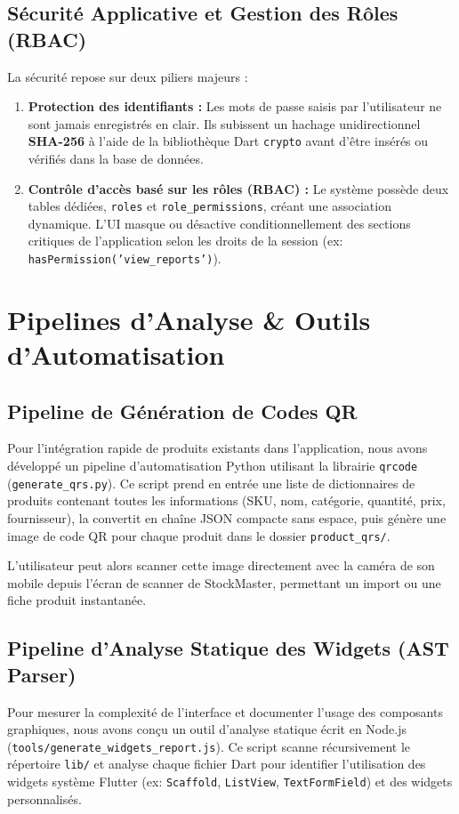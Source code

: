 \documentclass[12pt,a4paper]{report}
\begin{document}
\section{Sécurité Applicative et Gestion des Rôles (RBAC)}
La sécurité repose sur deux piliers majeurs :
\begin{enumerate}
    \item \textbf{Protection des identifiants :} Les mots de passe saisis par l'utilisateur ne sont jamais enregistrés en clair. Ils subissent un hachage unidirectionnel \textbf{SHA-256} à l'aide de la bibliothèque Dart \texttt{crypto} avant d'être insérés ou vérifiés dans la base de données.
    \item \textbf{Contrôle d'accès basé sur les rôles (RBAC) :} Le système possède deux tables dédiées, \texttt{roles} et \texttt{role\_permissions}, créant une association dynamique. L'UI masque ou désactive conditionnellement des sections critiques de l'application selon les droits de la session (ex: \texttt{hasPermission('view\_reports')}).
\end{enumerate}

\newpage

\chapter{Pipelines d'Analyse \& Outils d'Automatisation}

\section{Pipeline de Génération de Codes QR}
Pour l'intégration rapide de produits existants dans l'application, nous avons développé un pipeline d'automatisation Python utilisant la librairie \texttt{qrcode} (\texttt{generate\_qrs.py}). 
Ce script prend en entrée une liste de dictionnaires de produits contenant toutes les informations (SKU, nom, catégorie, quantité, prix, fournisseur), la convertit en chaîne JSON compacte sans espace, puis génère une image de code QR pour chaque produit dans le dossier \texttt{product\_qrs/}.

L'utilisateur peut alors scanner cette image directement avec la caméra de son mobile depuis l'écran de scanner de StockMaster, permettant un import ou une fiche produit instantanée.

\section{Pipeline d'Analyse Statique des Widgets (AST Parser)}
Pour mesurer la complexité de l'interface et documenter l'usage des composants graphiques, nous avons conçu un outil d'analyse statique écrit en Node.js (\texttt{tools/generate\_widgets\_report.js}). 
Ce script scanne récursivement le répertoire \texttt{lib/} et analyse chaque fichier Dart pour identifier l'utilisation des widgets système Flutter (ex: \texttt{Scaffold}, \texttt{ListView}, \texttt{TextFormField}) et des widgets personnalisés. 
\end{document}
